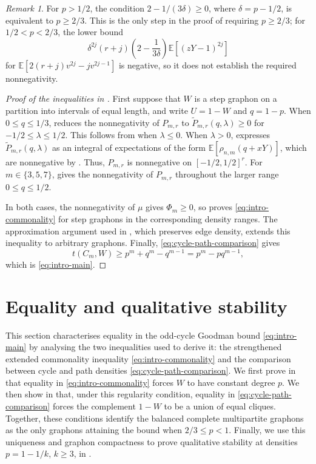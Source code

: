 \documentclass[11pt]{article}
\theoremstyle{remark}
\newtheorem{remark}[theorem]{Remark}
\numberwithin{equation}{section}
\newcommand{\E}{\mathbb E}
\newcommand{\tC}[2]{t(C_{#1},#2)}
\begin{document}
\begin{remark}\label{rem:pge23-threshold}
  For $p>1/2$, the condition $2-1/(3\delta)\ge0$, where
  $\delta=p-1/2$, is equivalent to $p\ge2/3$.
  This is the only step in the proof of 
  requiring $p\ge2/3$; for $1/2<p<2/3$, the lower bound
  \[
    \delta^{2j}(r+j)\left(2-\frac{1}{3\delta}\right)
    \E\left[(zY-1)^{2j}\right]
  \]
  for $\E\left[2(r+j)v^{2j}-jv^{2j-1}\right]$ is negative, so it does
  not establish the required nonnegativity.
\end{remark}

\medskip

\begin{proof}[Proof of the inequalities in ]
  First suppose that $W$ is a step graphon on a partition into intervals of equal length, and write $U=1-W$ and $q=1-p$.
  When $0\le q\le1/3$,  reduces the nonnegativity of $P_{m,r}$ to
  $\widetilde P_{m,r}(q,\lambda)\ge0$ for $-1/2\le\lambda\le1/2$.
  This follows from  when $\lambda\le0$.
  When $\lambda>0$,  expresses
  $\widetilde P_{m,r}(q,\lambda)$ as an integral of expectations of the form
  $\E\left[\rho_{n,m}(q+xY)\right]$, which are nonnegative by
  .
  Thus, $P_{m,r}$ is nonnegative on $[-1/2,1/2]^r$.
  For $m\in\{3,5,7\}$,  gives the nonnegativity of $P_{m,r}$ throughout the larger range $0\le q\le1/2$.

  In both cases, the nonnegativity of $\mu$ gives $\Phi_m\ge0$, so  proves \eqref{eq:intro-commonality} for step graphons in the corresponding density ranges.
  The approximation argument used in , which preserves edge density, extends this inequality to arbitrary graphons.
  Finally, \eqref{eq:cycle-path-comparison} gives
  \[
    \tC mW\ge p^m+q^m-q^{m-1}=p^m-pq^{m-1},
  \]
  which is \eqref{eq:intro-main}.
\end{proof}

\section{Equality and qualitative stability}
\label{sec:equality-stability}

This section characterises equality in the odd-cycle Goodman bound \eqref{eq:intro-main}
by analysing the two inequalities used to derive it: the strengthened
extended commonality inequality \eqref{eq:intro-commonality} and the
comparison between cycle and path densities \eqref{eq:cycle-path-comparison}.
We first prove in  that equality in
\eqref{eq:intro-commonality} forces $W$ to have constant degree $p$.
We then show in  that, under this regularity condition,
equality in \eqref{eq:cycle-path-comparison} forces the complement $1-W$
to be a union of equal cliques.
Together, these conditions identify the balanced complete multipartite graphons as the only graphons attaining the bound when $2/3\le p<1$.
Finally, we use this uniqueness and graphon compactness to prove qualitative
stability at densities $p=1-1/k$, $k\ge3$, in .
\end{document}
